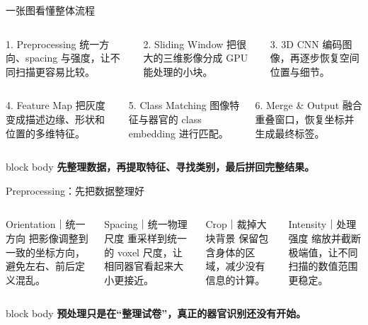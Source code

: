 \documentclass[aspectratio=169,12pt]{beamer}
\newcommand{\takeaway}[1]{%
  \begin{beamercolorbox}[wd=\linewidth,sep=.16cm,center,rounded=true,shadow=true]{block body}
    \textcolor{BeamerDeep}{\textbf{#1}}
  \end{beamercolorbox}
}
\begin{document}
\begin{frame}{一张图看懂整体流程}
  \vspace{0.10cm}
  \begin{columns}[T,onlytextwidth]
      \begin{block}{1. Preprocessing}
        统一方向、spacing 与强度，让不同扫描更容易比较。
      \end{block}
      \begin{block}{2. Sliding Window}
        把很大的三维影像分成 GPU 能处理的小块。
      \end{block}
      \begin{block}{3. 3D CNN}
        编码图像，再逐步恢复空间位置与细节。
      \end{block}
  \end{columns}

  \vspace{0.05cm}
  \begin{columns}[T,onlytextwidth]
      \begin{block}{4. Feature Map}
        把灰度变成描述边缘、形状和位置的多维特征。
      \end{block}
      \begin{block}{5. Class Matching}
        图像特征与器官的 class embedding 进行匹配。
      \end{block}
      \begin{block}{6. Merge \& Output}
        融合重叠窗口，恢复坐标并生成最终标签。
      \end{block}
  \end{columns}

  \vfill
  \takeaway{{\fontsize{11.8}{15.2}\selectfont
    先整理数据，再提取特征、寻找类别，最后拼回完整结果。}}
\end{frame}

\begin{frame}{Preprocessing：先把数据整理好}
  \begin{columns}[T,onlytextwidth]
      \begin{block}{Orientation｜统一方向}
        把影像调整到一致的坐标方向，避免左右、前后定义混乱。
      \end{block}
      \begin{block}{Spacing｜统一物理尺度}
        重采样到统一的 voxel 尺度，让相同器官看起来大小更接近。
      \end{block}
      \begin{block}{Crop｜裁掉大块背景}
        保留包含身体的区域，减少没有信息的计算。
      \end{block}
      \begin{block}{Intensity｜处理强度}
        缩放并截断极端值，让不同扫描的数值范围更稳定。
      \end{block}
  \end{columns}

  \vspace{0.10cm}
  \takeaway{预处理只是在“整理试卷”，真正的器官识别还没有开始。}
\end{frame}
\end{document}
